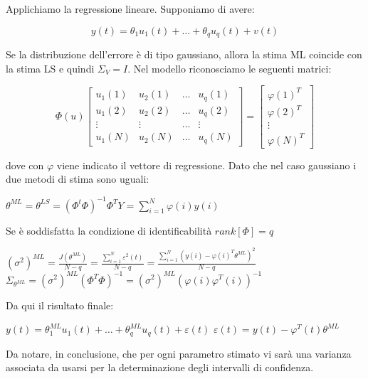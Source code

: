 \begin{esempio}
Applichiamo la regressione lineare. Supponiamo di avere:

  \[ y(t)=\theta_1u_1(t)+ \dots +\theta_qu_q(t)+v(t) \]

Se la distribuzione dell'errore è di tipo gaussiano, allora la stima ML coincide con la stima LS e quindi $\Sigma_V=I$. Nel modello riconosciamo le seguenti matrici:

  \[ \Phi(u)\begin{bmatrix} u_1(1) & u_2(1) & \dots & u_q(1) \\ u_1(2) & u_2(2) & \dots & u_q(2)\\ \vdots & \vdots & \dots & \vdots \\ u_1(N) & u_2(N) & \dots & u_q(N) \end{bmatrix}=\begin{bmatrix} \varphi(1)^T \\  \varphi(2)^T \\ \vdots \\ \varphi(N)^T \end{bmatrix} \]

dove con $\varphi$ viene indicato il vettore di regressione. Dato che nel caso gaussiano i due metodi di stima sono uguali:
\begin{center}
  $\theta^{ML}=\theta^{LS}=(\Phi^t\Phi)^{-1}\Phi^TY=\sum_{i=1}^{N} \varphi(i) y(i)$
\end{center}
Se è soddisfatta la condizione di identificabilità $rank[\Phi]=q$
\begin{center}
  $(\sigma^2)^{ML}=\frac{J(\theta^{ML})}{N-q}=\frac{\sum_{i=1}^{N} \varepsilon^2(t) }{N-q}=\frac{\sum_{i=1}^{N} {\left(y(i)-\varphi(i)^T\theta^{ML}\right)^2}}{N-q}$\newline
  $\Sigma_{\theta^{ML}}=(\sigma^2)^{ML}(\Phi^T\Phi)^{-1}=(\sigma^2)^{ML} { (\varphi(i) \varphi^T(i) )^{-1}}$
\end{center}
Da qui il risultato finale:
\begin{center}
  $y(t)=\theta_1^{ML}u_1(t)+ \dots +\theta^{ML}_qu_q(t)+\varepsilon (t)$\newline
  $\varepsilon (t)=y(t)-\varphi^T(t)\theta^{ML}$
\end{center}
Da notare, in conclusione, che per ogni parametro stimato vi sarà una varianza associata da usarsi per la determinazione degli intervalli di confidenza.
\end{esempio}
